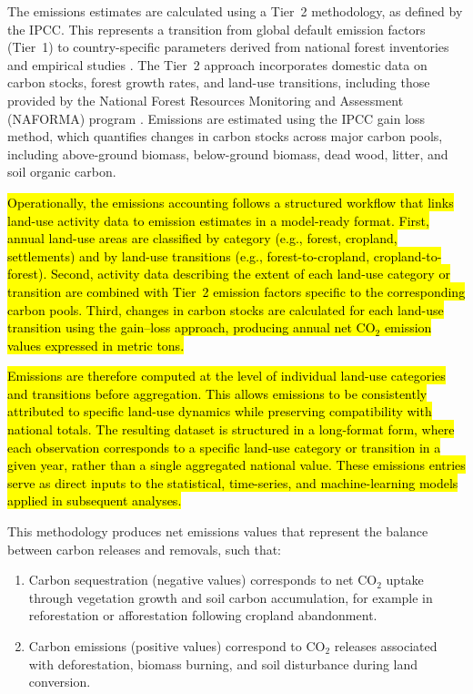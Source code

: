 \documentclass[10pt,letterpaper]{article}
\begin{document}
The emissions estimates are calculated using a Tier~2 methodology, as defined by the IPCC. This represents a transition from global default emission factors (Tier~1) to country-specific parameters derived from national forest inventories and empirical studies \cite{lao2023carbon,ramirez2020analysis}. The Tier~2 approach incorporates domestic data on carbon stocks, forest growth rates, and land-use transitions, including those provided by the National Forest Resources Monitoring and Assessment (NAFORMA) program \cite{rajala2022naforma}. Emissions are estimated using the IPCC gain loss method, which quantifies changes in carbon stocks across major carbon pools, including above-ground biomass, below-ground biomass, dead wood, litter, and soil organic carbon.

\hl{Operationally, the emissions accounting follows a structured workflow that links land-use activity data to emission estimates in a model-ready format. First, annual land-use areas are classified by category (e.g., forest, cropland, settlements) and by land-use transitions (e.g., forest-to-cropland, cropland-to-forest). Second, activity data describing the extent of each land-use category or transition are combined with Tier~2 emission factors specific to the corresponding carbon pools. Third, changes in carbon stocks are calculated for each land-use transition using the gain--loss approach, producing annual net CO$_2$ emission values expressed in metric tons.}

\hl{Emissions are therefore computed at the level of individual land-use categories and transitions before aggregation. This allows emissions to be consistently attributed to specific land-use dynamics while preserving compatibility with national totals. The resulting dataset is structured in a long-format form, where each observation corresponds to a specific land-use category or transition in a given year, rather than a single aggregated national value. These emissions entries serve as direct inputs to the statistical, time-series, and machine-learning models applied in subsequent analyses.}

This methodology produces net emissions values that represent the balance between carbon releases and removals, such that:
\begin{enumerate}
	\item Carbon sequestration (negative values) corresponds to net CO$_2$ uptake through vegetation growth and soil carbon accumulation, for example in reforestation or afforestation following cropland abandonment.
	\item Carbon emissions (positive values) correspond to CO$_2$ releases associated with deforestation, biomass burning, and soil disturbance during land conversion.
\end{enumerate}
\end{document}
